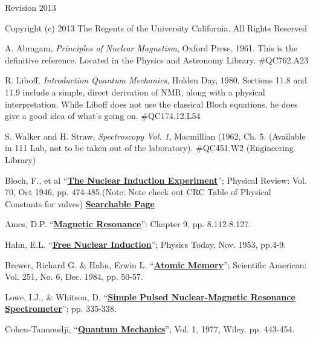 \documentclass{../lab}
\begin{document}
Revision 2013

Copyright (c) 2013 The Regents of the University California. All Rights Reserved

\begin{thebibliography}{}
\label{References}
     A. Abragam, \emph{Principles of Nuclear Magnetism}, Oxford Press, 1961. This is the definitive reference.  Located in the Physics and Astronomy Library. \#QC762.A23

     R. Liboff, \emph{Introduction Quantum Mechanics}, Holden Day, 1980. Sections 11.8 and 11.9 include a simple, direct derivation of NMR, along with a physical interpretation. While Liboff does not use the classical Bloch equations, he does give a good idea of what's going on. \#QC174.12.L54

     S. Walker and H. Straw, \emph{Spectroscopy Vol. 1}, Macmillian (1962, Ch. 5. (Available in 111 Lab, not to be taken out of the laboratory). \#QC451.W2 (Engineering Library)

     Bloch, F., et al ``\href{http://prola.aps.org/abstract/PR/v70/i7-8/p474\_1}{\textbf{The Nuclear Induction Experiment}}''; Physical Review: Vol. 70, Oct 1946, pp. 474-485.(Note: Note check out CRC Table of Physical Constants for valves) \href{http://physics111.lib.berkeley.edu/Physics111/Reprints/NMR/04-The\_Nuclear\_Induction\_Experiment.pdf}{\textbf{Searchable Page}}

     Ames, D.P. ``\href{http://physics111.lib.berkeley.edu/Physics111/Reprints/NMR/05-Magnetic\_Resonance.pdf}{\textbf{Magnetic Resonance}}'': Chapter 9, pp. 8.112-8.127.

     Hahn, E.L. ``\href{http://physics111.lib.berkeley.edu/Physics111/Reprints/NMR/06-Free\_Nuclear\_Induction.pdf}{\textbf{Free Nuclear Induction}}''; Physics Today, Nov. 1953, pp.4-9.

     Brewer, Richard G. \& Hahn, Erwin L. ``\href{http://physics111.lib.berkeley.edu/Physics111/Reprints/NMR/07-Atomic\_Memory.pdf}{\textbf{Atomic Memory}}''; Scientific American: Vol. 251, No. 6, Dec. 1984, pp. 50-57.

     Lowe, I.J., \& Whitson, D. ``\href{http://physics111.lib.berkeley.edu/Physics111/Reprints/NMR/08-Simple\_Pulsed\_NMR\_Spectrometer.pdf}{\textbf{Simple Pulsed Nuclear-Magnetic Resonance Spectrometer}}''; pp. 335-338.

     Cohen-Tannoudji, ``\href{http://physics111.lib.berkeley.edu/Physics111/Reprints/NMR/09-Quantum\_Mechanics.pdf}{\textbf{Quantum Mechanics}}''; Vol. 1, 1977, Wiley. pp. 443-454.


\end{thebibliography}
\end{document}
